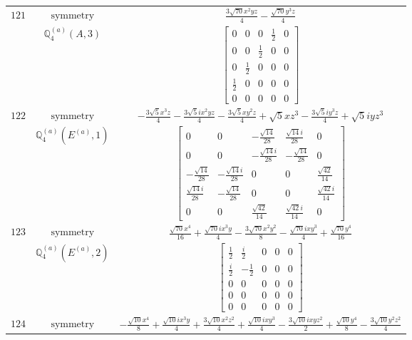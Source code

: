 \documentclass[fleqn,8pt,landscape]{jsarticle}
\begin{document}
\begin{longtable}{ccc}
$ 121 $ & $ \text{symmetry} $ & $ \frac{3 \sqrt{70} x^{2} y z}{4} - \frac{\sqrt{70} y^{3} z}{4} $ \\
$  $ & $ \mathbb{Q}_{4}^{(a)}(A,3) $ & $ \begin{bmatrix} 0 & 0 & 0 & \frac{1}{2} & 0 \\ 0 & 0 & \frac{1}{2} & 0 & 0 \\ 0 & \frac{1}{2} & 0 & 0 & 0 \\ \frac{1}{2} & 0 & 0 & 0 & 0 \\ 0 & 0 & 0 & 0 & 0 \end{bmatrix} $ \\ \hline
$ 122 $ & $ \text{symmetry} $ & $ - \frac{3 \sqrt{5} x^{3} z}{4} - \frac{3 \sqrt{5} i x^{2} y z}{4} - \frac{3 \sqrt{5} x y^{2} z}{4} + \sqrt{5} x z^{3} - \frac{3 \sqrt{5} i y^{3} z}{4} + \sqrt{5} i y z^{3} $ \\
$  $ & $ \mathbb{Q}_{4}^{(a)}(E^{(a)},1) $ & $ \begin{bmatrix} 0 & 0 & - \frac{\sqrt{14}}{28} & \frac{\sqrt{14} i}{28} & 0 \\ 0 & 0 & - \frac{\sqrt{14} i}{28} & - \frac{\sqrt{14}}{28} & 0 \\ - \frac{\sqrt{14}}{28} & - \frac{\sqrt{14} i}{28} & 0 & 0 & \frac{\sqrt{42}}{14} \\ \frac{\sqrt{14} i}{28} & - \frac{\sqrt{14}}{28} & 0 & 0 & \frac{\sqrt{42} i}{14} \\ 0 & 0 & \frac{\sqrt{42}}{14} & \frac{\sqrt{42} i}{14} & 0 \end{bmatrix} $ \\ \hline
$ 123 $ & $ \text{symmetry} $ & $ \frac{\sqrt{70} x^{4}}{16} + \frac{\sqrt{70} i x^{3} y}{4} - \frac{3 \sqrt{70} x^{2} y^{2}}{8} - \frac{\sqrt{70} i x y^{3}}{4} + \frac{\sqrt{70} y^{4}}{16} $ \\
$  $ & $ \mathbb{Q}_{4}^{(a)}(E^{(a)},2) $ & $ \begin{bmatrix} \frac{1}{2} & \frac{i}{2} & 0 & 0 & 0 \\ \frac{i}{2} & - \frac{1}{2} & 0 & 0 & 0 \\ 0 & 0 & 0 & 0 & 0 \\ 0 & 0 & 0 & 0 & 0 \\ 0 & 0 & 0 & 0 & 0 \end{bmatrix} $ \\ \hline
$ 124 $ & $ \text{symmetry} $ & $ - \frac{\sqrt{10} x^{4}}{8} + \frac{\sqrt{10} i x^{3} y}{4} + \frac{3 \sqrt{10} x^{2} z^{2}}{4} + \frac{\sqrt{10} i x y^{3}}{4} - \frac{3 \sqrt{10} i x y z^{2}}{2} + \frac{\sqrt{10} y^{4}}{8} - \frac{3 \sqrt{10} y^{2} z^{2}}{4} $ \\

\end{longtable}
\end{document}
